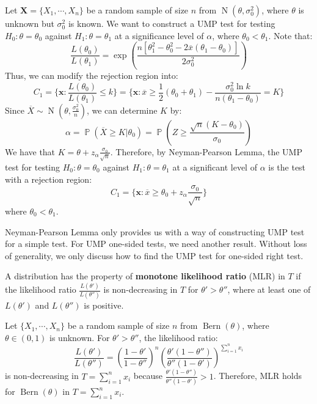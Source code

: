 \documentclass{huhtakm-template-book-v2}
\DeclareMathOperator{\prob}{\mathbb{P}}
\DeclareMathOperator{\Bern}{Bern}
\DeclareMathOperator{\N}{N}
\begin{document}
\begin{eg}
	Let $\mathbf{X}=\{X_{1},\cdots,X_{n}\}$ be a random sample of size $n$ from $\N(\theta,\sigma_{0}^{2})$, where $\theta$ is unknown but $\sigma_{0}^{2}$ is known. We want to construct a UMP test for testing $H_{0}:\theta=\theta_{0}$ against $H_{1}:\theta=\theta_{1}$ at a significance level of $\alpha$, where $\theta_{0}<\theta_{1}$. Note that:
	\begin{equation*}
		\frac{L(\theta_{0})}{L(\theta_{1})}=\exp\left(\frac{n[\theta_{1}^{2}-\theta_{0}^{2}-2\overline{x}(\theta_{1}-\theta_{0})]}{2\sigma_{0}^{2}}\right)
	\end{equation*}
	Thus, we can modify the rejection region into:
	\begin{equation*}
		C_{1}=\biggl\{\mathbf{x}:\frac{L(\theta_{0})}{L(\theta_{1})}\leq k\biggr\}=\biggl\{\mathbf{x}:\overline{x}\geq \frac{1}{2}(\theta_{0}+\theta_{1})-\frac{\sigma_{0}^{2}\ln{k}}{n(\theta_{1}-\theta_{0})}=K\biggr\}
	\end{equation*}
	Since $\overline{X}\sim\N(\theta,\frac{\sigma_{0}^{2}}{n})$, we can determine $K$ by:
	\begin{equation*}
		\alpha=\prob(\overline{X}\geq K|\theta_{0})=\prob\left(Z\geq\frac{\sqrt{n}(K-\theta_{0})}{\sigma_{0}}\right)
	\end{equation*}
	We have that $K=\theta+z_{\alpha}\frac{\sigma_{0}}{\sqrt{n}}$. Therefore, by Neyman-Pearson Lemma, the UMP test for testing $H_{0}:\theta=\theta_{0}$ against $H_{1}:\theta=\theta_{1}$ at a significant level of $\alpha$ is the test with a rejection region:
	\begin{equation*}
		C_{1}=\biggl\{\mathbf{x}:\overline{x}\geq\theta_{0}+z_{\alpha}\frac{\sigma_{0}}{\sqrt{n}}\biggr\}
	\end{equation*}
	where $\theta_{0}<\theta_{1}$.
\end{eg}
Neyman-Pearson Lemma only provides us with a way of constructing UMP test for a simple test. For UMP one-sided tests, we need another result. Without loss of generality, we only discuss how to find the UMP test for one-sided right test.
\begin{defn}
	A distribution has the property of \textbf{monotone likelihood ratio} (MLR) in $T$ if the likelihood ratio $\frac{L(\theta')}{L(\theta'')}$ is non-decreasing in $T$ for $\theta'>\theta''$, where at least one of $L(\theta')$ and $L(\theta'')$ is positive.
\end{defn}
\begin{eg}
	Let $\{X_{1},\cdots,X_{n}\}$ be a random sample of size $n$ from $\Bern(\theta)$, where $\theta\in(0,1)$ is unknown. For $\theta'>\theta''$, the likelihood ratio:
	\begin{equation*}
		\frac{L(\theta')}{L(\theta'')}=\left(\frac{1-\theta'}{1-\theta''}\right)^{n}\left(\frac{\theta'(1-\theta'')}{\theta''(1-\theta')}\right)^{\sum_{i=1}^{n}x_{i}}
	\end{equation*}
	is non-decreasing in $T=\sum_{i=1}^{n}x_{i}$ because $\frac{\theta'(1-\theta'')}{\theta''(1-\theta')}>1$. Therefore, MLR holds for $\Bern(\theta)$ in $T=\sum_{i=1}^{n}x_{i}$.
\end{eg}
\end{document}
